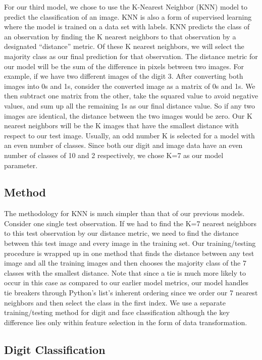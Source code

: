 \documentclass[10pt,parskip=half,
toc=sectionentrywithdots,
bibliography=totocnumbered,
captions=tableheading,numbers=noendperiod]{scrartcl}
\begin{document}
For our third model, we chose to use the K-Nearest Neighbor (KNN) model
to predict the classification of an image. KNN is also a form of
supervised learning where the model is trained on a data set with
labels. KNN predicts the class of an observation by finding the K
nearest neighbors to that observation by a designated ``distance''
metric. Of these K nearest neighbors, we will select the majority class
as our final prediction for that observation. The distance metric for
our model will be the sum of the difference in pixels between two
images. For example, if we have two different images of the digit 3.
After converting both images into 0s and 1s, consider the converted
image as a matrix of 0s and 1s. We then subtract one matrix from the
other, take the squared value to avoid negative values, and sum up all
the remaining 1s as our final distance value. So if any two images are
identical, the distance between the two images would be zero. Our K
nearest neighbors will be the K images that have the smallest distance
with respect to our test image. Usually, an odd number K is selected for
a model with an even number of classes. Since both our digit and image
data have an even number of classes of 10 and 2 respectively, we chose
K=7 as our model parameter.

\hypertarget{method}{%
\subsection{Method}\label{method}}

The methodology for KNN is much simpler than that of our previous
models. Consider one single test observation. If we had to find the K=7
nearest neighbors to this test observation by our distance metric, we
need to find the distance between this test image and every image in the
training set. Our training/testing procedure is wrapped up in one method
that finds the distance between any test image and all the training
images and then chooses the majority class of the 7 classes with the
smallest distance. Note that since a tie is much more likely to occur in
this case as compared to our earlier model metrics, our model handles
tie breakers through Python's list's inherent ordering since we order
our 7 nearest neighbors and then select the class in the first index. We
use a separate training/testing method for digit and face classification
although the key difference lies only within feature selection in the
form of data transformation.

\hypertarget{digit-classification}{%
\subsection{Digit Classification}\label{digit-classification}}
\end{document}
